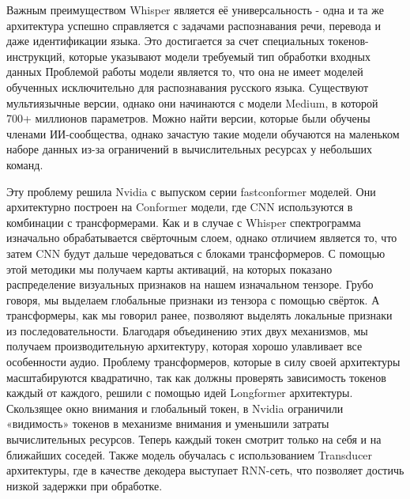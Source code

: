 Важным преимуществом Whisper является её универсальность - одна и та же архитектура успешно справляется с задачами распознавания речи, перевода и даже идентификации языка.
Это достигается за счет специальных токенов-инструкций, которые указывают модели требуемый тип обработки входных данных
Проблемой работы модели является то, что она не имеет моделей обученных исключительно для распознавания русского языка.
Существуют мультиязычные версии, однако они начинаются с модели Medium, в которой 700+ миллионов параметров.
Можно найти версии, которые были обучены членами ИИ-сообщества, однако зачастую такие модели обучаются на маленьком наборе данных из-за ограничений в вычислительных ресурсах у небольших команд.

Эту проблему решила Nvidia с выпуском серии fastconformer моделей. 
Они архитектурно построен на Conformer модели, где CNN используются в комбинации с трансформерами.
Как и в случае с Whisper спектрограмма изначально обрабатывается свёрточным слоем, однако отличием является то, что затем CNN будут дальше чередоваться с блоками трансформеров.
С помощью этой методики мы получаем карты активаций, на которых показано распределение визуальных признаков на нашем изначальном тензоре.
Грубо говоря, мы выделаем глобальные признаки из тензора с помощью свёрток.
А трансформеры, как мы говорил ранее, позволяют выделять локальные признаки из последовательности.
Благодаря объединению этих двух механизмов, мы получаем производительную архитектуру, которая хорошо улавливает все особенности аудио.
Проблему трансформеров, которые в силу своей архитектуры масштабируются квадратично, так как должны проверять зависимость токенов каждый от каждого, решили с помощью идей Longformer архитектуры.
Скользящее окно внимания и глобальный токен, в Nvidia ограничили «видимость» токенов в механизме внимания и уменьшили затраты вычислительных ресурсов.
Теперь каждый токен смотрит только на себя и на ближайших соседей.
Также модель обучалась с использованием Transducer архитектуры, где в качестве декодера выступает RNN-сеть, что позволяет достичь низкой задержки при обработке.

